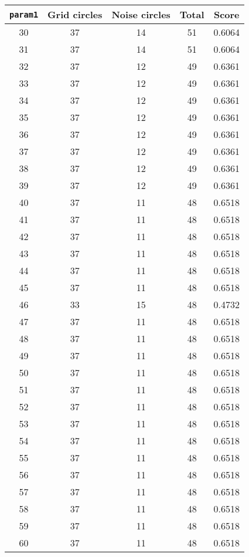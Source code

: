 \documentclass[letterpaper, 12pt]{article}
\begin{document}
\begin{longtable}{|c|c|c|c|c|}
\hline
\textbf{\texttt{param1}} & \textbf{Grid circles} & \textbf{Noise circles} & \textbf{Total} & \textbf{Score} \\
\hline
30 & 37 & 14 & 51 & 0.6064 \\
\hline
31 & 37 & 14 & 51 & 0.6064 \\
\hline
32 & 37 & 12 & 49 & 0.6361 \\
\hline
33 & 37 & 12 & 49 & 0.6361 \\
\hline
34 & 37 & 12 & 49 & 0.6361 \\
\hline
35 & 37 & 12 & 49 & 0.6361 \\
\hline
36 & 37 & 12 & 49 & 0.6361 \\
\hline
37 & 37 & 12 & 49 & 0.6361 \\
\hline
38 & 37 & 12 & 49 & 0.6361 \\
\hline
39 & 37 & 12 & 49 & 0.6361 \\
\hline
40 & 37 & 11 & 48 & 0.6518 \\
\hline
41 & 37 & 11 & 48 & 0.6518 \\
\hline
42 & 37 & 11 & 48 & 0.6518 \\
\hline
43 & 37 & 11 & 48 & 0.6518 \\
\hline
44 & 37 & 11 & 48 & 0.6518 \\
\hline
45 & 37 & 11 & 48 & 0.6518 \\
\hline
46 & 33 & 15 & 48 & 0.4732 \\
\hline
47 & 37 & 11 & 48 & 0.6518 \\
\hline
48 & 37 & 11 & 48 & 0.6518 \\
\hline
49 & 37 & 11 & 48 & 0.6518 \\
\hline
50 & 37 & 11 & 48 & 0.6518 \\
\hline
51 & 37 & 11 & 48 & 0.6518 \\
\hline
52 & 37 & 11 & 48 & 0.6518 \\
\hline
53 & 37 & 11 & 48 & 0.6518 \\
\hline
54 & 37 & 11 & 48 & 0.6518 \\
\hline
55 & 37 & 11 & 48 & 0.6518 \\
\hline
56 & 37 & 11 & 48 & 0.6518 \\
\hline
57 & 37 & 11 & 48 & 0.6518 \\
\hline
58 & 37 & 11 & 48 & 0.6518 \\
\hline
59 & 37 & 11 & 48 & 0.6518 \\
\hline
60 & 37 & 11 & 48 & 0.6518 \\

\end{longtable}
\end{document}

